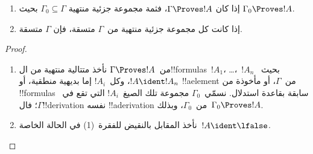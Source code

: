 \documentclass[../../../include/open-logic-section]{subfiles}
\begin{document}
\begin{prop}[التراص]
  \begin{enumerate}
  \item إذا كان $\Gamma \Proves !A$، فثمة مجموعة جزئية منتهية $\Gamma_0
    \subseteq \Gamma$ بحيث $\Gamma_0 \Proves !A$.
  \item إذا كانت كل مجموعة جزئية منتهية من~$\Gamma$ متسقة، فإن
    $\Gamma$ متسقة.
  \end{enumerate}
\end{prop}

\begin{proof}
  \begin{enumerate}
    \item من~$\Gamma \Proves !A$ نأخذ متتالية منتهية من
      ال!!{formula}s~$!A_1$، \dots،~$!A_n$ بحيث~$!A \ident !A_n$،
      وكل~$!A_i$ إما بديهية منطقية، أو !!a{element} من~$\Gamma$،
      أو مأخوذة من !!{formula}s سابقة بقاعدة استدلال.
      نسمّي~$\Gamma_0$ مجموعة تلك الصيغ~$!A_i$ التي تقع
      في~$\Gamma$؛ فال!!{derivation} نفسه !!a{derivation}
      من~$\Gamma_0$، وبذلك~$\Gamma_0 \Proves !A$.
    \item نأخذ المقابل بالنقيض للفقرة~(1) في الحالة الخاصة~$!A
      \ident \lfalse$.

\end{enumerate}
\end{proof}
\end{document}
